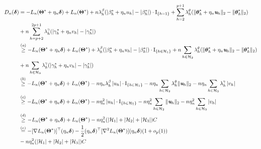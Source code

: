 \documentclass[12pt,letter]{article}\usepackage[]{graphicx}\usepackage[]{color}
\newcommand{\btheta}{\boldsymbol{\theta}}
\newcommand{\bThetastar}{\boldsymbol{\Theta}^{*}}
\newcommand{\bdelta}{\boldsymbol{\delta}}
\begin{document}
\begin{align}
D_{n}(\bdelta) & =-L_{n}(\bThetastar+\eta_{n}\bdelta)+L_{n}(\bThetastar)  + n \lambda_{h}^{\beta}(\left|\beta_{h}^*+\eta_n u_h\right| - |\beta_h^*|) \cdot \textrm{I}_{\lbrace h=1 \rbrace} +  \sum_{h=2}^{p+1}  \lambda_{h}^{\theta} (\| \btheta_{h}^* + \eta_{n}\textit{\textbf{u}}_h\|_{2} - \|\btheta_{h}^* \|_2 ) \nonumber\\  
& +n\sum_{h=p+2}^{2p+1}\lambda_{h}^{\gamma}( \left|\gamma_{h}^* + \eta_{n}v_h\right| -        \left|\gamma_{h}^*\right|) \nonumber\\
%
& \overset{(a)}{\geq} -L_{n}(\bThetastar+\eta_{n}\bdelta)+L_{n}(\bThetastar)  
+   \lambda_{h}^{\beta}(\left|\beta_{h}^*+\eta_n u_h\right| - |\beta_h^*|) \cdot \textrm{I}_{\lbrace h \in \mathcal{H}_1 \rbrace} +  n \sum_{h \in \mathcal{H}_2} \lambda_{h}^{\theta} (\| \btheta_{h}^* + \eta_{n}\textit{\textbf{u}}_h\|_{2} - \|\btheta_{h}^* \|_2 ) \nonumber\\  
& +n\sum_{h \in \mathcal{H}_3}\lambda_{h}^{\gamma}( \left|\gamma_{h}^* + \eta_{n}v_h\right| -        \left|\gamma_{h}^*\right|)\nonumber \\
%
& \overset{(b)}{\geq} -L_{n}(\bThetastar+\eta_{n}\bdelta)+L_{n}(\bThetastar)  - n \eta_{n}  \lambda_{h}^{\beta}\left|u_h\right| \cdot \textrm{I}_{\lbrace h \in \mathcal{H}_1 \rbrace}  -      n \eta_{n}\sum_{h \in \mathcal{H}_2}     \lambda_{h}^{\theta} \| \textit{\textbf{u}}_h\|_{2} - n \eta_n \sum_{h \in \mathcal{H}_3}\lambda_{h}^{\gamma} \left|v_h\right| \nonumber \\
%
%
& \overset{(c)}{\geq} -L_{n}(\bThetastar+\eta_{n}\bdelta)+L_{n}(\bThetastar)  - n \eta_{n}^2  \left|u_h\right| \cdot \textrm{I}_{\lbrace h \in \mathcal{H}_1 \rbrace}  -      n \eta_{n}^2 \sum_{h \in \mathcal{H}_2}    \| \textit{\textbf{u}}_h\|_{2} - n \eta_n^2 \sum_{h \in \mathcal{H}_3} \left|v_h\right| \nonumber \\
%
%
& \overset{(d)}{\geq} -L_{n}(\bThetastar+\eta_{n}\bdelta)+L_{n}(\bThetastar) - n \eta_{n}^2 ( |\mathcal{H}_1| + |\mathcal{H}_2| + |\mathcal{H}_3|) C \nonumber \\
%
%
%
& \overset{(e)}{=}-[\nabla L_{n}(\bThetastar)]^{\top}(\eta_{n}\bdelta)-\frac{1}{2}(\eta_{n}\bdelta)^{\top}[\nabla^{2}L_{n}(\bThetastar)](\eta_{n}\bdelta)(1+o_{p}(1)) \nonumber \\ 
& - n \eta_{n}^2 ( |\mathcal{H}_1| + |\mathcal{H}_2|+ |\mathcal{H}_3| ) C \label{eq:lemma1}
\end{align}
\end{document}
